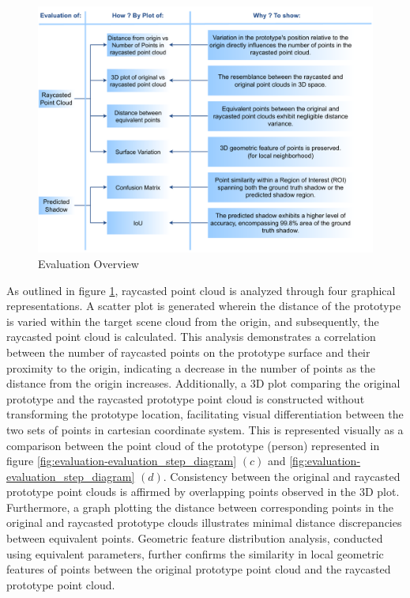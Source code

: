 \begin{figure}[htbp]
    \centering
    \includegraphics[width=0.75\linewidth]{97_graphics//evaluation/evaluation_block_diagram.pdf}
    \caption{Evaluation Overview}
    \label{fig:evaluation-evaluation_block_diagram}
\end{figure}

As outlined in figure \ref{fig:evaluation-evaluation_block_diagram}, raycasted point cloud is analyzed through four graphical representations. A scatter plot is generated wherein the distance of the prototype is varied within the target scene cloud from the origin, and subsequently, the raycasted point cloud is calculated. This analysis demonstrates a correlation between the number of raycasted points on the prototype surface and their proximity to the origin, indicating a decrease in the number of points as the distance from the origin increases. Additionally, a 3D plot comparing the original prototype and the raycasted prototype point cloud is constructed without transforming the prototype location, facilitating visual differentiation between the two sets of points in cartesian coordinate system. This is represented visually as a comparison between the point cloud of the prototype (person) represented in figure \ref{fig:evaluation-evaluation_step_diagram} \((c)\) and \ref{fig:evaluation-evaluation_step_diagram} \((d)\). Consistency between the original and raycasted prototype point clouds is affirmed by overlapping points observed in the 3D plot. Furthermore, a graph plotting the distance between corresponding points in the original and raycasted prototype clouds illustrates minimal distance discrepancies between equivalent points. Geometric feature distribution analysis, conducted using equivalent parameters, further confirms the similarity in local geometric features of points between the original prototype point cloud and the raycasted prototype point cloud.


